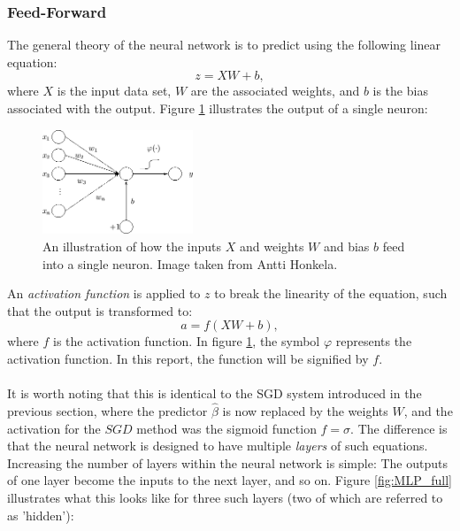         \subsubsection{Feed-Forward}
            The general theory of the neural network is to predict using the following linear equation:
            \begin{equation}\label{eq:z1}
                z = X W + b,
            \end{equation}
            where $X$ is the input data set, $W$ are the associated weights, and $b$ is the bias associated with the output. Figure \ref{fig:MLP_conc} illustrates the output of a single neuron:
            \begin{figure}[H]
                \centering
                \includegraphics[width=0.4\textwidth]{figures/MLP.png}
                \caption{An illustration of how the inputs $X$ and weights $W$ and bias $b$ feed into a single neuron. Image taken from Antti Honkela.}
                \label{fig:MLP_conc}
            \end{figure}
            An \textit{activation function} is applied to $z$ to break the linearity of the equation, such that the output is transformed to:
            \begin{equation}\label{eq:a1}
                a = f\left( X W + b \right),
            \end{equation}
            where $f$ is the activation function. In figure \ref{fig:MLP_conc}, the symbol $\varphi$ represents the activation function. In this report, the function will be signified by $f$.\\\\
            It is worth noting that this is identical to the SGD system introduced in the previous section, where the predictor $\hat{\beta}$ is now replaced by the weights $W$, and the activation for the $SGD$ method was the sigmoid function $f=\sigma$. The difference is that the neural network is designed to have multiple \textit{layers} of such equations. Increasing the number of layers within the neural network is simple: The outputs of one layer become the inputs to the next layer, and so on. Figure \ref{fig:MLP_full} illustrates what this looks like for three such layers (two of which are referred to as 'hidden'):
